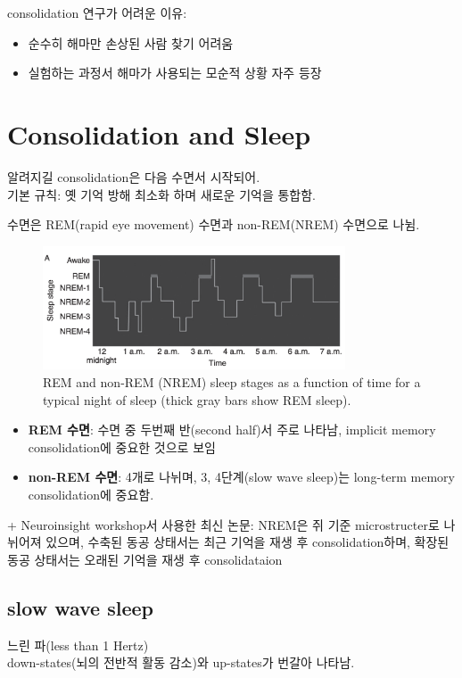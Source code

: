 \documentclass[../note.tex]{subfiles}
\begin{document}
\begin{itemize}
consolidation 연구가 어려운 이유:
\begin{itemize}
  \item 순수히 해마만 손상된 사람 찾기 어려움
  \item 실험하는 과정서 해마가 사용되는 모순적 상황 자주 등장
\end{itemize}

\section{Consolidation and Sleep}
알려지길 consolidation은 다음 수면서 시작되어.\\
기본 규칙: 옛 기억 방해 최소화 하며 새로운 기억을 통합함.

수면은 REM(rapid eye movement) 수면과 non-REM(NREM) 수면으로 나뉨.\\
\begin{figure}[htbp]
  \centering
  \includegraphics[width=0.8\textwidth]{image/sleep_p}
  \caption{REM and non-REM (NREM) sleep stages as a function of time for
a typical night of sleep (thick gray bars show REM sleep).}
  \label{fig:sleep_p}
\end{figure}

\begin{itemize}
  \item \textbf{REM 수면}:
    수면 중 두번째 반(second half)서 주로 나타남, implicit memory consolidation에 중요한 것으로 보임
  \item \textbf{non-REM 수면}:
    4개로 나뉘며, 3, 4단계(slow wave sleep)는 long-term memory consolidation에 중요함.
\end{itemize}

+ Neuroinsight workshop서 사용한 최신 논문: NREM은 쥐 기준 microstructer로 나뉘어져 있으며,
수축된 동공 상태서는 최근 기억을 재생 후 consolidation하며, 확장된 동공 상태서는 오래된 기억을 재생 후 consolidataion\\

\subsection{slow wave sleep}
느린 파(less than 1 Hertz)\\
down-states(뇌의 전반적 활동 감소)와 up-states가 번갈아 나타남.


\end{itemize}
\end{document}
